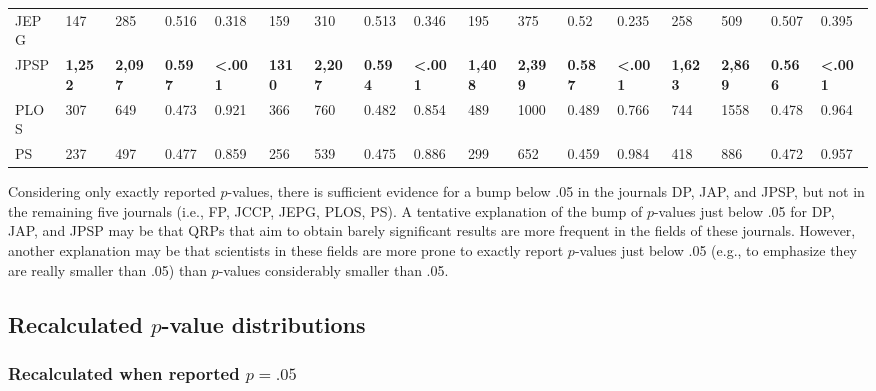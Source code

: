 \documentclass[a5paper]{book}
\begin{document}
\begin{landscape}
\begin{table}[t]
{\begin{tabular}{lllllllllllllllll}
\addlinespace
JEPG & 147 & 285 & 0.516 & 0.318 & 159 & 310 & 0.513 & 0.346 & 195 & 375 & 0.52 & 0.235 & 258 & 509 & 0.507 & 0.395\\
\rowcolor{gray!6}  JPSP & \textbf{1,252} & \textbf{2,097} & \textbf{0.597} & \textbf{<.001} & \textbf{1310} & \textbf{2,207} & \textbf{0.594} & \textbf{<.001} & \textbf{1,408} & \textbf{2,399} & \textbf{0.587} & \textbf{<.001} & \textbf{1,623} & \textbf{2,869} & \textbf{0.566} & \textbf{<.001}\\
PLOS & 307 & 649 & 0.473 & 0.921 & 366 & 760 & 0.482 & 0.854 & 489 & 1000 & 0.489 & 0.766 & 744 & 1558 & 0.478 & 0.964\\
\rowcolor{gray!6}  PS & 237 & 497 & 0.477 & 0.859 & 256 & 539 & 0.475 & 0.886 & 299 & 652 & 0.459 & 0.984 & 418 & 886 & 0.472 & 0.957\\
\bottomrule
\end{tabular}}
\end{table}
\end{landscape}

Considering only exactly reported \(p\)-values, there is sufficient
evidence for a bump below .05 in the journals DP, JAP, and JPSP, but not
in the remaining five journals (i.e., FP, JCCP, JEPG, PLOS, PS). A
tentative explanation of the bump of \(p\)-values just below .05 for DP,
JAP, and JPSP may be that QRPs that aim to obtain barely significant
results are more frequent in the fields of these journals. However,
another explanation may be that scientists in these fields are more
prone to exactly report \(p\)-values just below .05 (e.g., to emphasize
they are really smaller than .05) than \(p\)-values considerably smaller
than .05.

\subsection{\texorpdfstring{Recalculated \(p\)-value
distributions}{Recalculated p-value distributions}}\label{recalculated-p-value-distributions}

\subsubsection{\texorpdfstring{Recalculated when reported
\(p=.05\)}{Recalculated when reported p=.05}}\label{recalculated-when-reported-p.05}
\end{document}
